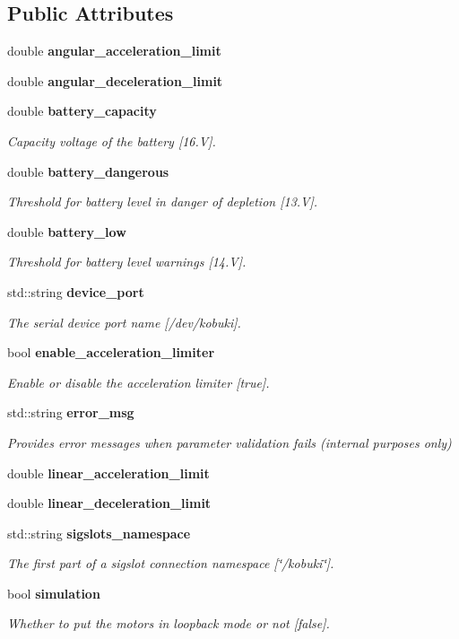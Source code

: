 \subsection*{\-Public \-Attributes}
\begin{DoxyCompactItemize}
\item 
double {\bf angular\-\_\-acceleration\-\_\-limit}
\item 
double {\bf angular\-\_\-deceleration\-\_\-limit}
\item 
double {\bf battery\-\_\-capacity}
\begin{DoxyCompactList}\small\item\em \-Capacity voltage of the battery [16.\-V]. \end{DoxyCompactList}\item 
double {\bf battery\-\_\-dangerous}
\begin{DoxyCompactList}\small\item\em \-Threshold for battery level in danger of depletion [13.\-V]. \end{DoxyCompactList}\item 
double {\bf battery\-\_\-low}
\begin{DoxyCompactList}\small\item\em \-Threshold for battery level warnings [14.\-V]. \end{DoxyCompactList}\item 
std\-::string {\bf device\-\_\-port}
\begin{DoxyCompactList}\small\item\em \-The serial device port name [/dev/kobuki]. \end{DoxyCompactList}\item 
bool {\bf enable\-\_\-acceleration\-\_\-limiter}
\begin{DoxyCompactList}\small\item\em \-Enable or disable the acceleration limiter [true]. \end{DoxyCompactList}\item 
std\-::string {\bf error\-\_\-msg}
\begin{DoxyCompactList}\small\item\em \-Provides error messages when parameter validation fails (internal purposes only) \end{DoxyCompactList}\item 
double {\bf linear\-\_\-acceleration\-\_\-limit}
\item 
double {\bf linear\-\_\-deceleration\-\_\-limit}
\item 
std\-::string {\bf sigslots\-\_\-namespace}
\begin{DoxyCompactList}\small\item\em \-The first part of a sigslot connection namespace [\char`\"{}/kobuki\char`\"{}]. \end{DoxyCompactList}\item 
bool {\bf simulation}
\begin{DoxyCompactList}\small\item\em \-Whether to put the motors in loopback mode or not [false]. \end{DoxyCompactList}\end{DoxyCompactItemize}


